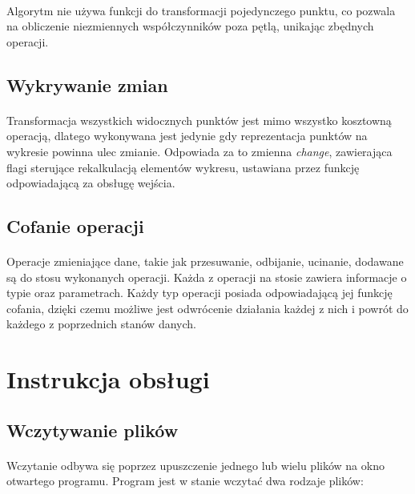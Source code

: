 \documentclass[12pt]{report}
\begin{document}
	\paragraph{}
	Algorytm nie używa funkcji do transformacji pojedynczego punktu, co pozwala na obliczenie niezmiennych współczynników poza pętlą, unikając zbędnych operacji.
	
	\subsection{Wykrywanie zmian}
	\paragraph{}
	Transformacja wszystkich widocznych punktów jest mimo wszystko kosztowną operacją, dlatego wykonywana jest jedynie gdy reprezentacja punktów na wykresie powinna ulec zmianie. Odpowiada za to zmienna \textit{change}, zawierająca flagi sterujące rekalkulacją elementów wykresu, ustawiana przez funkcję odpowiadającą za obsługę wejścia.
	
	
	\subsection{Cofanie operacji}
	\paragraph{}
	Operacje zmieniające dane, takie jak przesuwanie, odbijanie, ucinanie, dodawane są do stosu wykonanych operacji. Każda z operacji na stosie zawiera informacje o typie oraz parametrach. Każdy typ operacji posiada odpowiadającą jej funkcję cofania, dzięki czemu możliwe jest odwrócenie działania każdej z nich i powrót do każdego z poprzednich stanów danych.
	
	
	\pagebreak
	\section{Instrukcja obsługi}
	\subsection{Wczytywanie plików}
	\paragraph{}
	Wczytanie odbywa się poprzez upuszczenie jednego lub wielu plików na okno otwartego programu. Program jest w stanie wczytać dwa rodzaje plików:
	
\end{document}
